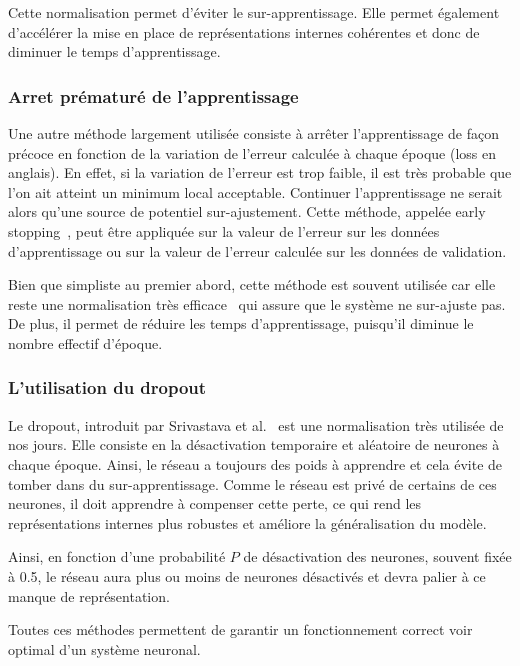 Cette normalisation permet d'éviter le sur-apprentissage. Elle permet également d'accélérer la mise en place de représentations internes cohérentes et donc de diminuer le temps d'apprentissage.

\subsubsection{Arret prématuré de l'apprentissage}
Une autre méthode largement utilisée consiste à arrêter l'apprentissage de façon précoce en fonction de la variation de l'erreur calculée à chaque époque (loss en anglais). En effet, si la variation de l'erreur est trop faible, il est très probable que l'on ait atteint un minimum local acceptable. Continuer l'apprentissage ne serait alors qu'une source de potentiel sur-ajustement. Cette méthode, appelée early stopping~\cite{Prechelt1996}, peut être appliquée sur la valeur de l'erreur sur les données d'apprentissage ou sur la valeur de l'erreur calculée sur les données de validation.

Bien que simpliste au premier abord, cette méthode est souvent utilisée car elle reste une normalisation très efficace~\cite{Finnoff1993} qui assure que le système ne sur-ajuste pas. De plus, il permet de réduire les temps d'apprentissage, puisqu'il diminue le nombre effectif d'époque.

\subsubsection{L'utilisation du dropout}
Le dropout, introduit par Srivastava et al.~\cite{Srivastava2014} est une normalisation très utilisée de nos jours. Elle consiste en la désactivation temporaire et aléatoire de neurones à chaque époque. Ainsi, le réseau a toujours des poids à apprendre et cela évite de tomber dans du sur-apprentissage. Comme le réseau est privé de certains de ces neurones, il doit apprendre à compenser cette perte, ce qui rend les représentations internes plus robustes et améliore la généralisation du modèle.

Ainsi, en fonction d'une probabilité $P$ de désactivation des neurones, souvent fixée à 0.5, le réseau aura plus ou moins de neurones désactivés et devra palier à ce manque de représentation.

Toutes ces méthodes permettent de garantir un fonctionnement correct voir optimal d'un système neuronal.

